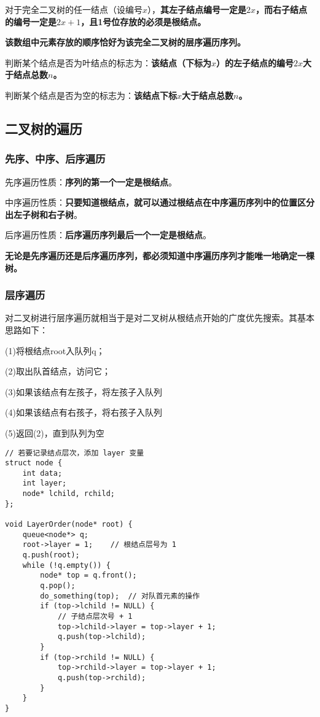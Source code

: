 对于完全二叉树的任一结点（设编号$x$），\textbf{其左子结点编号一定是$2x$，而右子结点的编号一定是$2x+1$，且1号位存放的必须是根结点。}

\textbf{该数组中元素存放的顺序恰好为该完全二叉树的层序遍历序列。}

判断某个结点是否为叶结点的标志为：\textbf{该结点（下标为$x$）的左子结点的编号$2x$大于结点总数$n$。}

判断某个结点是否为空的标志为：\textbf{该结点下标$x$大于结点总数$n$。}

\subsection{二叉树的遍历}

\subsubsection{先序、中序、后序遍历}

先序遍历性质：\textbf{序列的第一个一定是根结点}。

中序遍历性质：\textbf{只要知道根结点，就可以通过根结点在中序遍历序列中的位置区分出左子树和右子树}。

后序遍历性质：\textbf{后序遍历序列最后一个一定是根结点}。

\textbf{无论是先序遍历还是后序遍历序列，都必须知道中序遍历序列才能唯一地确定一棵树。}

\subsubsection{层序遍历}

对二叉树进行层序遍历就相当于是对二叉树从根结点开始的广度优先搜索。其基本思路如下：

(1)将根结点root入队列q；

(2)取出队首结点，访问它；

(3)如果该结点有左孩子，将左孩子入队列

(4)如果该结点有右孩子，将右孩子入队列

(5)返回(2)，直到队列为空

\begin{lstlisting}
// 若要记录结点层次，添加 layer 变量
struct node {
	int data;
	int layer;
	node* lchild, rchild;
};

void LayerOrder(node* root) {
	queue<node*> q;
	root->layer = 1;	// 根结点层号为 1
	q.push(root);
	while (!q.empty()) {
		node* top = q.front();
		q.pop();
		do_something(top);	// 对队首元素的操作
		if (top->lchild != NULL) {
			// 子结点层次号 + 1
			top->lchild->layer = top->layer + 1;
			q.push(top->lchild);
		}
		if (top->rchild != NULL) {
			top->rchild->layer = top->layer + 1;
			q.push(top->rchild);
		}
	}
}
\end{lstlisting}

